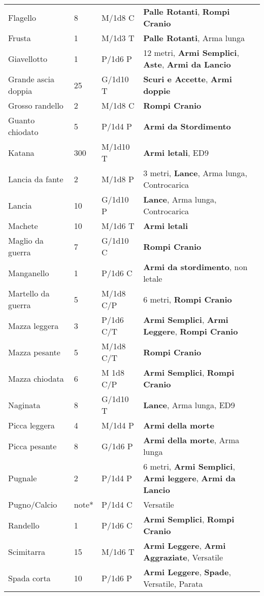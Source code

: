 \documentclass[landscape,10pt,a4paper]{article}
\begin{document}
\begin{multicols}{2}
{\begin{tabularx}{0.95\textwidth}{llll}
	Flagello& 8& M/1d8 C& \textbf{Palle Rotanti}, \textbf{Rompi Cranio}\\
	Frusta& 1& M/1d3 T& \textbf{Palle Rotanti}, Arma lunga\\
	Giavellotto& 1& P/1d6 P& 12 metri, \textbf{Armi Semplici}, \textbf{Aste}, \textbf{Armi da Lancio}\\
	Grande ascia doppia& 25 & G/1d10 T& \textbf{Scuri e Accette}, \textbf{Armi doppie}\\
	Grosso randello& 2& M/1d8 C&\textbf{Rompi Cranio}\\
	Guanto chiodato& 5& P/1d4 P&\textbf{Armi da Stordimento}\\
	Katana& 300& M/1d10 T& \textbf{Armi letali}, ED9\\
	Lancia da fante& 2& M/1d8 P&3 metri, \textbf{Lance}, Arma lunga, Controcarica\\
	Lancia& 10 & G/1d10 P&\textbf{Lance}, Arma lunga, Controcarica\\
	Machete& 10 & M/1d6 T&\textbf{Armi letali}\\
	Maglio da guerra& 7& G/1d10 C& \textbf{Rompi Cranio}\\
	Manganello& 1& P/1d6 C& \textbf{Armi da stordimento}, non letale\\
	Martello da guerra& 5& M/1d8 C/P& 6 metri, \textbf{Rompi Cranio}\\
	Mazza leggera& 3& P/1d6 C/T& \textbf{Armi Semplici}, \textbf{Armi Leggere}, \textbf{Rompi Cranio} \\
	Mazza pesante& 5& M/1d8 C/T& \textbf{Rompi Cranio}\\
	Mazza chiodata& 6& M 1d8 C/P& \textbf{Armi Semplici}, \textbf{Rompi Cranio}\\
	Naginata& 8& G/1d10 T&\textbf{Lance}, Arma lunga, ED9\\
	Picca leggera& 4& M/1d4 P&\textbf{Armi della morte}\\
	Picca pesante& 8& G/1d6 P&\textbf{Armi della morte}, Arma lunga\\
	Pugnale& 2& P/1d4 P& 6 metri, \textbf{Armi Semplici}, \textbf{Armi leggere}, \textbf{Armi da Lancio}\\
	Pugno/Calcio & note*& P/1d4 C&Versatile\\
	Randello& 1& P/1d6 C& \textbf{Armi Semplici}, \textbf{Rompi Cranio}\\
	Scimitarra& 15 & M/1d6 T&\textbf{Armi Leggere}, \textbf{Armi Aggraziate}, Versatile\\
	Spada corta& 10 & P/1d6 P&\textbf{Armi Leggere}, \textbf{Spade}, Versatile, Parata\\

\end{tabularx}}
\end{multicols}
\end{document}
